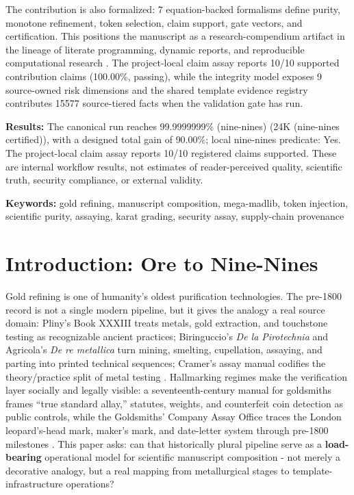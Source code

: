 \documentclass[
  english,
]{article}
\begin{document}
The contribution is also formalized: 7 equation-backed formalisms define
purity, monotone refinement, token selection, claim support, gate
vectors, and certification. This positions the manuscript as a
research-compendium artifact in the lineage of literate programming,
dynamic reports, and reproducible computational research
\citep{knuth1984literate, leisch2002sweave, peng2011reproducible, sandve2013ten}.
The project-local claim assay reports 10/10 supported contribution
claims (100.00\%, passing), while the integrity model exposes 9
source-owned risk dimensions and the shared template evidence registry
contributes 15577 source-tiered facts when the validation gate has run.

\textbf{Results:} The canonical run reaches 99.9999999\% (nine-nines)
(24K (nine-nines certified)), with a designed total gain of 90.00\%;
local nine-nines predicate: Yes. The project-local claim assay reports
10/10 registered claims supported. These are internal workflow results,
not estimates of reader-perceived quality, scientific truth, security
compliance, or external validity.

\textbf{Keywords:} gold refining, manuscript composition, mega-madlib,
token injection, scientific purity, assaying, karat grading, security
assay, supply-chain provenance

\newpage

\section{Introduction: Ore to Nine-Nines}\label{sec:introduction}

Gold refining is one of humanity's oldest purification technologies. The
pre-1800 record is not a single modern pipeline, but it gives the
analogy a real source domain: Pliny's Book XXXIII treats metals, gold
extraction, and touchstone testing as recognizable ancient practices;
Biringuccio's \emph{De la Pirotechnia} and Agricola's \emph{De re
metallica} turn mining, smelting, cupellation, assaying, and parting
into printed technical sequences; Cramer's assay manual codifies the
theory/practice split of metal testing
\citep{pliny_natural_history_33, biringuccio_pirotechnia_1540, agricola_de_re_metallica_1556, cramer_assaying_metals_1741}.
Hallmarking regimes make the verification layer socially and legally
visible: a seventeenth-century manual for goldsmiths frames ``true
standard allay,'' statutes, weights, and counterfeit coin detection as
public controls, while the Goldsmiths' Company Assay Office traces the
London leopard's-head mark, maker's mark, and date-letter system through
pre-1800 milestones
\citep{badcock_touchstone_1678, goldsmiths_hallmarking_history}. This
paper asks: can that historically plural pipeline serve as a
\textbf{load-bearing} operational model for scientific manuscript
composition - not merely a decorative analogy, but a real mapping from
metallurgical stages to template-infrastructure operations?
\end{document}
